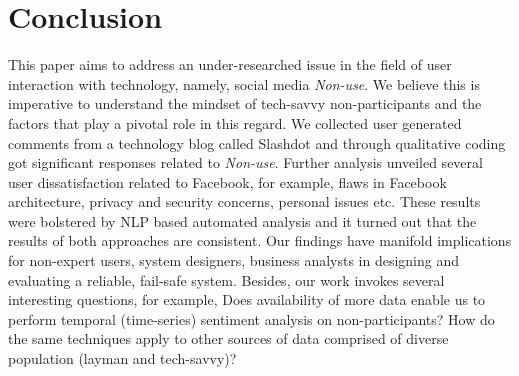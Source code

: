 \section{Conclusion}
\label{sec:conclusion}
This paper aims to address an under-researched issue in the field of user interaction with technology, namely, social media \textit{Non-use}. We believe this is imperative to understand the mindset of tech-savvy non-participants and the factors that play a pivotal role in this regard. We collected user generated comments from a technology blog called Slashdot and through qualitative coding got significant responses related to \textit{Non-use}. Further analysis unveiled several user dissatisfaction related to Facebook, for example, flaws in Facebook architecture, privacy and security concerns, personal issues etc. These results were bolstered by NLP based automated analysis and it turned out that the results of both approaches are consistent. Our findings have manifold implications for non-expert users, system designers, business analysts in designing and evaluating a reliable, fail-safe system. Besides, our work invokes several interesting questions, for example, Does availability of more data enable us to perform temporal (time-series) sentiment analysis on non-participants? How do the same techniques apply to other sources of data comprised of diverse population (layman and tech-savvy)? 